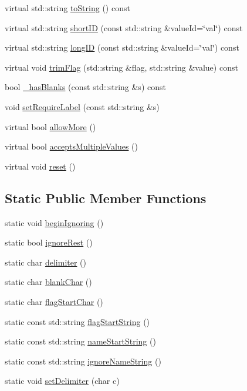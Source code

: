 \begin{DoxyCompactItemize}
virtual std\+::string \hyperlink{class_t_c_l_a_p_1_1_arg_ac98a357568c21f0eb6ca2220b8a3d4a2}{to\+String} () const 
\item 
virtual std\+::string \hyperlink{class_t_c_l_a_p_1_1_arg_aef8efaf3811162b2b2b2a84c6db280fa}{short\+I\+D} (const std\+::string \&value\+Id=\char`\"{}val\char`\"{}) const 
\item 
virtual std\+::string \hyperlink{class_t_c_l_a_p_1_1_arg_aad93aff46e1fc67e3853765f565bfa96}{long\+I\+D} (const std\+::string \&value\+Id=\char`\"{}val\char`\"{}) const 
\item 
virtual void \hyperlink{class_t_c_l_a_p_1_1_arg_a54595328e81f5fb77859563690faab25}{trim\+Flag} (std\+::string \&flag, std\+::string \&value) const 
\item 
bool \hyperlink{class_t_c_l_a_p_1_1_arg_a2eb0ffefe163218bdc8b4b7a33a974a7}{\+\_\+has\+Blanks} (const std\+::string \&s) const 
\item 
void \hyperlink{class_t_c_l_a_p_1_1_arg_aae5c959f31af1a484a8af06f84a6e8b0}{set\+Require\+Label} (const std\+::string \&s)
\item 
virtual bool \hyperlink{class_t_c_l_a_p_1_1_arg_a9aef735d37ef95ca1b7dc7a07850b984}{allow\+More} ()
\item 
virtual bool \hyperlink{class_t_c_l_a_p_1_1_arg_ad356870538a255d639e26b30330202ae}{accepts\+Multiple\+Values} ()
\item 
virtual void \hyperlink{class_t_c_l_a_p_1_1_arg_ab5b5dc9a9b0381561f0684523f943a2c}{reset} ()
\end{DoxyCompactItemize}
\subsection*{Static Public Member Functions}
\begin{DoxyCompactItemize}
\item 
static void \hyperlink{class_t_c_l_a_p_1_1_arg_a24165d31c1ec70777fb201356b6cdf6a}{begin\+Ignoring} ()
\item 
static bool \hyperlink{class_t_c_l_a_p_1_1_arg_a4d412155b8f9b4956e64e91c48e55a3b}{ignore\+Rest} ()
\item 
static char \hyperlink{class_t_c_l_a_p_1_1_arg_aadef6ca7e40f5b3d3fd03186976aea7e}{delimiter} ()
\item 
static char \hyperlink{class_t_c_l_a_p_1_1_arg_a0abd38f46dbf7d267078134a4817fbb2}{blank\+Char} ()
\item 
static char \hyperlink{class_t_c_l_a_p_1_1_arg_a7f9f6af439993e9151bd5a6cd2a63dad}{flag\+Start\+Char} ()
\item 
static const std\+::string \hyperlink{class_t_c_l_a_p_1_1_arg_af8e739295b0f75028e7bff6d670d97a1}{flag\+Start\+String} ()
\item 
static const std\+::string \hyperlink{class_t_c_l_a_p_1_1_arg_a1df2134870528b80f9f35347fef6fd14}{name\+Start\+String} ()
\item 
static const std\+::string \hyperlink{class_t_c_l_a_p_1_1_arg_a6ce0cbe4effd44679ca11f25e3c318e7}{ignore\+Name\+String} ()
\item 
static void \hyperlink{class_t_c_l_a_p_1_1_arg_ad059b63424001b9aedb4c019e2854c3c}{set\+Delimiter} (char c)
\end{DoxyCompactItemize}
